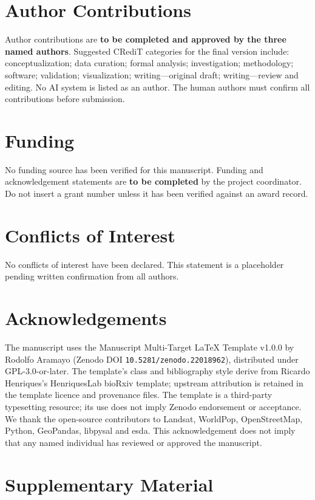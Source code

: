 \documentclass[times,twoside]{_Templates/MultiTargetManuscript}
\begin{document}
\section*{Author Contributions}

Author contributions are \textbf{to be completed and approved by the three named
authors}. Suggested CRediT categories for the final version include:
conceptualization; data curation; formal analysis; investigation; methodology;
software; validation; visualization; writing---original draft; writing---review
and editing. No AI system is listed as an author. The human authors must confirm
all contributions before submission.

\section*{Funding}

No funding source has been verified for this manuscript. Funding and
acknowledgement statements are \textbf{to be completed} by the project
coordinator. Do not insert a grant number unless it has been verified against an
award record.

\section*{Conflicts of Interest}

No conflicts of interest have been declared. This statement is a placeholder
pending written confirmation from all authors.

\section*{Acknowledgements}

The manuscript uses the Manuscript Multi-Target LaTeX Template v1.0.0 by Rodolfo
Aramayo (Zenodo DOI \texttt{10.5281/zenodo.22018962}), distributed under
GPL-3.0-or-later. The template's class and bibliography style derive from
Ricardo Henriques's HenriquesLab bioRxiv template; upstream attribution is
retained in the template licence and provenance files. The template is a
third-party typesetting resource; its use does not imply Zenodo endorsement or
acceptance. We thank the open-source contributors to Landsat, WorldPop,
OpenStreetMap, Python, GeoPandas, libpysal and esda. This acknowledgement does
not imply that any named individual has reviewed or approved the manuscript.

\section*{Supplementary Material}
\end{document}
